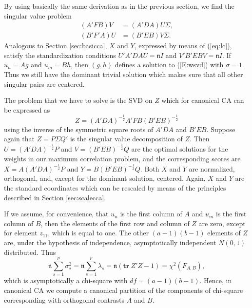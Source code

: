 \documentclass[article]{Z}
\begin{document}
By using basically the same derivation as in the previous section, we find the
singular value problem
\begin{subequations}\label{E:wsvd}
\begin{align}
(A'FB)V&=(A'DA)U\Sigma,\\
(B'F'A)U&=(B'EB)V\Sigma.
\end{align}
\end{subequations}
Analogous to Section \ref{sec:basicca}, $X$ and $Y$, expressed by means of (\ref{eq:lc}), satisfy the standardization conditions \(U'A'DAU=\mathfrak{n}I\) and \(V'B'EBV=\mathfrak{n}I\). If \(u_n=Ag\) and \(u_m=Bh\), then \((g,h)\) defines a solution to (\ref{E:wsvd}) with \(\sigma=1\). Thus we still have the dominant trivial solution which makes sure that all other singular pairs are centered.

The problem that we have to solve is the SVD on $Z$ which for canonical CA can be expressed as
\begin{equation}
\label{eq:Zcca}
Z=(A'DA)^{-\frac12}A'FB(B'EB)^{-\frac12}
\end{equation}  
using the inverse of the symmetric
square roots of \(A'DA\) and \(B'EB\). Suppose again that \(Z=P\Sigma Q'\) is the singular
value decomposition of \(Z\). Then \(U=(A'DA)^{-\frac12}P\) and \(V=(B'EB)^{-\frac12}Q\)
are the optimal solutions for the weights in our maximum correlation problem, and
the corresponding scores are \(X=A(A'DA)^{-\frac12}P\) and \(Y=B(B'EB)^{-\frac12}Q\).
Both \(X\) and \(Y\) are normalized, orthogonal, and, except for the dominant solution,
centered. Again, $X$ and $Y$ are the standard coordinates which can be rescaled by means of the principles described in Section \ref{sec:scalecca}.

If we assume, for convenience, that \(u_n\) is the first column of \(A\) and \(u_m\) is the
first column of \(B\), then the elements of the first row and column of \(Z\) are zero,
except for element \(z_{11}\), which is equal to one. The other \((a-1)(b-1)\) elements
of \(Z\) are, under the hypothesis of independence, asymptotically independent $N(0,1)$ distributed. Thus
\begin{equation}
\mathfrak{n}\sum_{s=1}^p\sigma_s^2=\mathfrak{n}\sum_{s=1}^p\lambda_s = \mathfrak{n}(\mathbf{tr}\ Z'Z-1) = \chi^2\left(F_{A,B}\right),
\end{equation}
which is asymptotically a chi-square with $df=(a-1)(b-1)$. Hence, in canonical CA we compute a canonical partition of the components of chi-square corresponding with orthogonal contrasts \(A\) and \(B\). 
\end{document}
